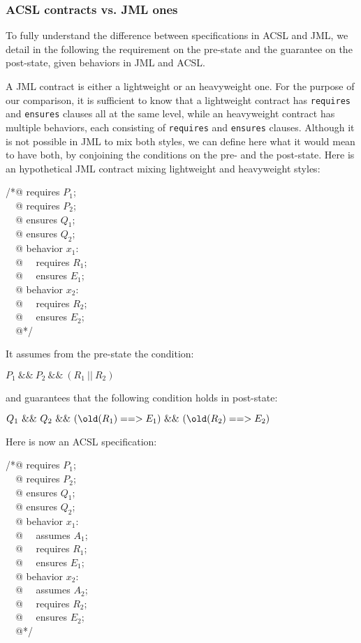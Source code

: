 \subsubsection*{ACSL contracts vs. JML ones}

To fully understand the difference between specifications in ACSL and
JML, we detail in the following the requirement on the pre-state and
the guarantee on the post-state, given behaviors in JML and ACSL.

A JML contract is either a lightweight or an heavyweight one.
For the purpose of our comparison, it is sufficient to know that a
lightweight contract has \verb|requires| and \verb|ensures| clauses
all at the same level, while an heavyweight contract has multiple
behaviors, each consisting of \verb|requires| and \verb|ensures|
clauses. Although it is not possible in JML to mix both styles, we can
define here what it would mean to have both, by conjoining the
conditions on the pre- and the post-state.
Here is an hypothetical JML contract mixing lightweight and
heavyweight styles:
\begin{flushleft}\ttfamily
/*@ requires $P_1$; \\
~~@ requires $P_2$; \\
~~@ ensures  $Q_1$; \\
~~@ ensures  $Q_2$; \\
~~@ behavior $x_1$: \\
~~@ ~~requires $R_1$; \\
~~@ ~~ensures $E_1$; \\
~~@ behavior $x_2$: \\
~~@ ~~requires $R_2$; \\
~~@ ~~ensures $E_2$; \\
~~@*/
\end{flushleft}
It assumes from the pre-state the condition:
\begin{center}
{\ttfamily $P_1 ~\&\&~ P_2 ~\&\&~ (R_1 ~||~ R_2)$}
\end{center}
and guarantees that the following condition holds in post-state:
\begin{center}
{\ttfamily $Q_1 ~\&\&~ Q_2 ~\&\&~ 
  (\texttt{{\textbackslash}old}(R_1) ==> E_1) ~\&\&~ (\texttt{{\textbackslash}old}(R_2) ==> E_2)$}
\end{center}


Here is now an ACSL specification:

\begin{flushleft}\ttfamily
/*@ requires $P_1$; \\
~~@ requires $P_2$; \\
~~@ ensures  $Q_1$; \\
~~@ ensures  $Q_2$; \\
~~@ behavior $x_1$: \\
~~@ ~~assumes $A_1$; \\
~~@ ~~requires $R_1$; \\
~~@ ~~ensures $E_1$; \\
~~@ behavior $x_2$: \\
~~@ ~~assumes $A_2$; \\
~~@ ~~requires $R_2$; \\
~~@ ~~ensures $E_2$; \\
~~@*/
\end{flushleft}

